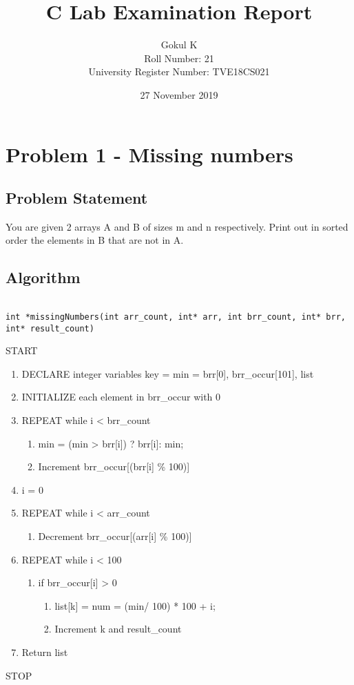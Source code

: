 \documentclass{article}
\title{C Lab Examination Report}
\author{Gokul K\\[2\baselineskip]
Roll Number: 21\\[2\baselineskip]
University Register Number: TVE18CS021}
\date{27 November 2019}
\begin{document}
\newpage
\maketitle

\section{Problem 1 - Missing numbers}
\subsection{Problem Statement}
You are given 2 arrays A and B of sizes m and n respectively. Print out in sorted order the elements in B that are not in A.
\subsection{Algorithm}
\begin{verbatim}
    
int *missingNumbers(int arr_count, int* arr, int brr_count, int* brr, int* result_count)
\end{verbatim}
\newline
START

\begin{flushleft}
\begin{enumerate}
\item DECLARE integer variables key = min = brr[0], brr\_occur[101], list
\item  INITIALIZE each element in brr\_occur with 0
\item REPEAT while i < brr\_count
\begin{enumerate}
 \item min = (min > brr[i]) ? brr[i]: min;
\item Increment brr\_occur[(brr[i] \% 100)]
\end{enumerate}
\item i = 0
\item REPEAT while i < arr\_count
\begin{enumerate}
 \item Decrement brr\_occur[(arr[i] \% 100)]
\end{enumerate}

\item REPEAT while i < 100
\begin{enumerate}
\item if brr\_occur[i] > 0
\begin{enumerate}
    \item list[k] = num = (min/ 100) * 100 + i;
    \item Increment k and result\_count
    \end{enumerate}
\end{enumerate}
\item Return list

\end{enumerate}
\end{flushleft}
STOP
\end{document}
